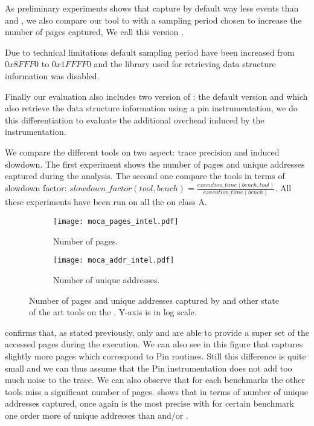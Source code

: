As preliminary experiments shows that \Mitos capture by
default way less events than \TABARNAC and \Moca, we also compare our tool to
\Mitos with a sampling period chosen to increase the number of pages
captured, We call this version \MitosTun.

Due to technical limitations \MemProf default sampling period have been
increased from  $0x8FFF0$ to $0x1FFFF0$ and the library used for retrieving
data structure information was disabled.

Finally our evaluation also includes two version of \Moca: the default version and
\MocaPin which also retrieve the data structure information using a pin
instrumentation, we do this differentiation to evaluate the additional
overhead induced by the instrumentation.

We compare the different tools on two aspect: trace
precision and induced slowdown. The first experiment shows the number of pages
and unique addresses captured during the analysis. The second one compare the
tools in terms of slowdown factor:
$slowdown\_factor(tool,bench)=\frac{execution\_time(bench,tool)}{execution\_time(bench)}$.
All these experiments have been run on all the \NPB on class A.

\begin{figure}[htb]
    \centering
    \begin{subfigure}{\linewidth}
        \texttt{[image: moca\_pages\_intel.pdf]}
        \caption{Number of pages.}
        \label{fig:pages}
    \end{subfigure}
    \begin{subfigure}{\linewidth}
        \texttt{[image: moca\_addr\_intel.pdf]}
        \caption{Number of unique addresses.}
        \label{fig:addr}
    \end{subfigure}
    \caption{Number of pages and unique addresses captured by \Moca and other
        state of the art tools
    on the \NPB. Y-axis is in log scale.}
    \label{fig:pages-addr}
\end{figure}


 confirms that, as stated previously, only \Moca and \TABARNAC are
able to provide a super set of the accessed pages during the execution. We can
also see in this figure that \MocaPin captures slightly more pages which
correspond to Pin routines. Still this difference is quite small and we can
thus assume that the Pin instrumentation does not add too much noise to the
trace. We can also observe that for each benchmarks the other tools miss a
significant number of pages.
 shows that in terms of number of unique addresses captured,
once again \Moca is the most precise with for certain benchmark one order more
of unique addresses than \Mitos and/or \MemProf.

